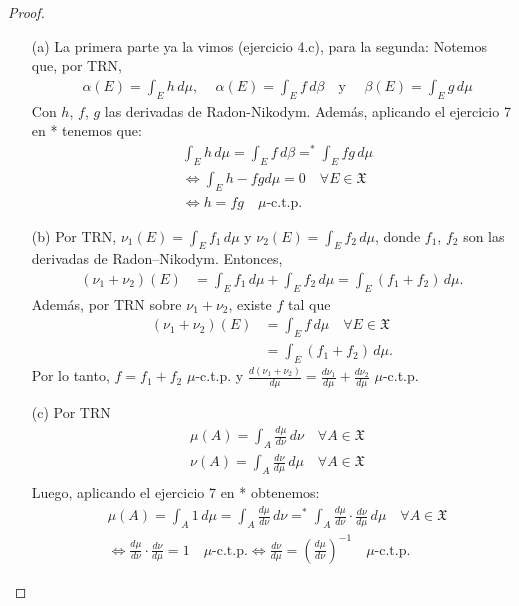 \documentclass[12pt]{article}
\begin{document}
\begin{proof}
    \begin{itemize}
        \item[(a)] La primera parte ya la vimos (ejercicio 4.c), para la segunda: Notemos que, por TRN, \begin{align*}
                   & \alpha(E) = \int_E h \, d\mu \text{, } \quad \alpha(E) = \int_E f \, d\beta \quad \text{y } \quad \beta(E) = \int_E g \, d\mu
              \end{align*}
              Con \(h \), \(f \), \(g \) las derivadas de Radon-Nikodym. Además, aplicando el ejercicio 7 en * tenemos que: \begin{align*}
                   & \int_E h \, d\mu = \int_E f \, d\beta =^* \int_E f g \, d\mu  \\
                   & \iff \int_E h - fg d \mu = 0 \quad \forall E \in \mathfrak{X} \\
                   & \iff h = fg \quad \mu\text{-c.t.p.}
              \end{align*}
        \item[(b)] Por TRN, \(\nu_1(E) = \int_E f_1 \, d\mu \) y \(\nu_2(E) = \int_E f_2 \, d\mu \), donde \(f_1 \), \(f_2 \) son las derivadas de Radon–Nikodym. Entonces, \begin{align*}
                  (\nu_1 + \nu_2)(E) & = \int_E f_1 \, d\mu + \int_E f_2 \, d\mu = \int_E (f_1 + f_2) \, d\mu.
              \end{align*}
              Además, por TRN sobre \(\nu_1 + \nu_2 \), existe \(f \) tal que \begin{align*}
                  (\nu_1 + \nu_2)(E) & = \int_E f \, d\mu \quad \forall E \in \mathfrak{X} \\
                                     & = \int_E (f_1 + f_2) \, d\mu.
              \end{align*}
              Por lo tanto, \(f = f_1 + f_2 \) \(\mu \)-c.t.p. y \(\frac{d(\nu_1 + \nu_2)}{d\mu} = \frac{d\nu_1}{d\mu} + \frac{d\nu_2}{d\mu} \) \(\mu \)-c.t.p.
        \item[(c)] Por TRN \begin{align*}
                   & \mu(A) = \int_A \frac{d\mu}{d\nu} \, d\nu \quad \forall A \in \mathfrak{X} \\
                   & \nu(A) = \int_A \frac{d\nu}{d\mu} \, d\mu \quad \forall A \in \mathfrak{X} \\
              \end{align*} Luego, aplicando el ejercicio 7 en * obtenemos: \begin{align*}
                   & \mu(A) = \int_A 1 \, d\mu = \int_A \frac{d\mu}{d\nu} \, d\nu =^* \int_A \frac{d\mu}{d\nu} \cdot \frac{d\nu}{d\mu} \, d\mu \quad \forall A \in \mathfrak{X}        \\
                   & \iff \frac{d\mu}{d\nu} \cdot \frac{d\nu}{d\mu} = 1 \quad \mu\text{-c.t.p.} \iff \frac{d\nu}{d\mu} = \left( \frac{d\mu}{d\nu} \right)^{-1} \quad \mu\text{-c.t.p.}
              \end{align*}
    \end{itemize}
\end{proof}
\end{document}
